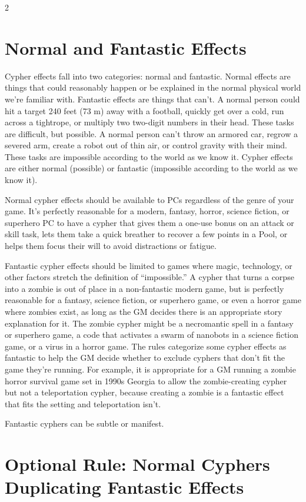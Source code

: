 \begin{multicols}{2}
\section{Normal and Fantastic Effects}

Cypher effects fall into two categories: normal and fantastic. Normal effects are things that could reasonably happen or be explained in the normal physical world we’re familiar with. Fantastic effects are things that can’t. A normal person could hit a target 240 feet (73 m) away with a football, quickly get over a cold, run across a tightrope, or multiply two two-digit numbers in their head. These tasks are difficult, but possible. A normal person can’t throw an armored car, regrow a severed arm, create a robot out of thin air, or control gravity with their mind. These tasks are impossible according to the world as we know it. Cypher effects are either normal (possible) or fantastic (impossible according to the world as we know it).

Normal cypher effects should be available to PCs regardless of the genre of your game. It’s perfectly reasonable for a modern, fantasy, horror, science fiction, or superhero PC to have a cypher that gives them a one-use bonus on an attack or skill task, lets them take a quick breather to recover a few points in a Pool, or helps them focus their will to avoid distractions or fatigue.

Fantastic cypher effects should be limited to games where magic, technology, or other factors stretch the definition of “impossible.” A cypher that turns a corpse into a zombie is out of place in a non-fantastic modern game, but is perfectly reasonable for a fantasy, science fiction, or superhero game, or even a horror game where zombies exist, as long as the GM decides there is an appropriate story explanation for it. The zombie cypher might be a necromantic spell in a fantasy or superhero game, a code that activates a swarm of nanobots in a science fiction game, or a virus in a horror game. The rules categorize some cypher effects as fantastic to help the GM decide whether to exclude cyphers that don’t fit the game they’re running. For example, it is appropriate for a GM running a zombie horror survival game set in 1990s Georgia to allow the zombie-creating cypher but not a teleportation cypher, because creating a zombie is a fantastic effect that fits the setting and teleportation isn’t.

Fantastic cyphers can be subtle or manifest. 

\section{Optional Rule: Normal Cyphers Duplicating Fantastic Effects}


\end{multicols}
